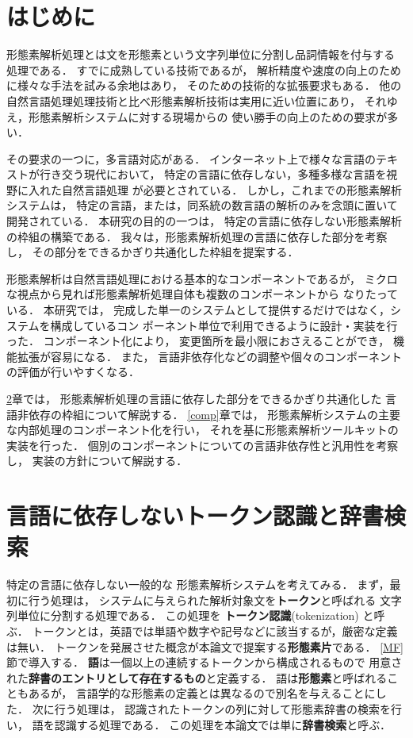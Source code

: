 \section{はじめに}

形態素解析処理とは文を形態素という文字列単位に分割し品詞情報を付与する
処理である．
すでに成熟している技術であるが，
解析精度や速度の向上のために様々な手法を試みる余地はあり，
そのための技術的な拡張要求もある．
他の自然言語処理処理技術と比べ形態素解析技術は実用に近い位置にあり，
それゆえ，形態素解析システムに対する現場からの
使い勝手の向上のための要求が多い．

その要求の一つに，多言語対応がある．
インターネット上で様々な言語のテキストが行き交う現代において，
特定の言語に依存しない，多種多様な言語を視野に入れた自然言語処理
が必要とされている．
しかし，これまでの形態素解析システムは，
特定の言語，または，同系統の数言語の解析のみを念頭に置いて
開発されている．
本研究の目的の一つは，
特定の言語に依存しない形態素解析の枠組の構築である．
我々は，形態素解析処理の言語に依存した部分を考察し，
その部分をできるかぎり共通化した枠組を提案する．

形態素解析は自然言語処理における基本的なコンポーネントであるが，
ミクロな視点から見れば形態素解析処理自体も複数のコンポーネントから
なりたっている．
本研究では，
完成した単一のシステムとして提供するだけではなく，システムを構成しているコン
ポーネント単位で利用できるように設計・実装を行った．
コンポーネント化により，
変更箇所を最小限におさえることができ，
機能拡張が容易になる．
また，
言語非依存化などの調整や個々のコンポーネントの評価が行いやすくなる．



\ref{tok}章では，
形態素解析処理の言語に依存した部分をできるかぎり共通化した
言語非依存の枠組について解説する．
\ref{comp}章では，
形態素解析システムの主要な内部処理のコンポーネント化を行い，
それを基に形態素解析ツールキットの実装を行った．
個別のコンポーネントについての言語非依存性と汎用性を考察し，
実装の方針について解説する．





\section{言語に依存しないトークン認識と辞書検索}\label{tok}

特定の言語に依存しない一般的な
形態素解析システムを考えてみる．
まず，最初に行う処理は，
システムに与えられた解析対象文を{\bf トークン}と呼ばれる
文字列単位に分割する処理である．
この処理を {\bf トークン認識}(tokenization) と呼ぶ．
トークンとは，英語では単語や数字や記号などに該当するが，厳密な定義は無い．
トークンを発展させた概念が本論文で提案する{\bf 形態素片}である．
\ref{MF}節で導入する．
{\bf 語}は一個以上の連続するトークンから構成されるもので
用意された{\bf 辞書のエントリとして存在するもの}と定義する．
語は{\bf 形態素}と呼ばれることもあるが，
言語学的な形態素の定義とは異なるので別名を与えることにした．
次に行う処理は，
認識されたトークンの列に対して形態素辞書の検索を行い，
語を認識する処理である．
この処理を本論文では単に{\bf 辞書検索}と呼ぶ．

